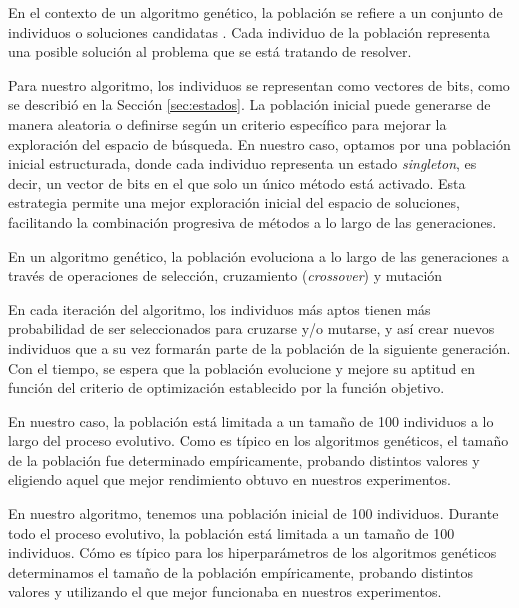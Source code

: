 En el contexto de un algoritmo genético, la población se refiere a un conjunto de individuos o soluciones candidatas \cite{Goldberg:1989}. 
Cada individuo de la población representa una posible solución al problema que se está tratando de resolver.

Para nuestro algoritmo, los individuos se representan como vectores de bits, como se describió en la Sección \ref{sec:estados}. 
La población inicial puede generarse de manera aleatoria o definirse según un criterio específico para mejorar la exploración del espacio de búsqueda. 
En nuestro caso, optamos por una población inicial estructurada, donde cada individuo representa un estado \emph{singleton}, es decir, 
un vector de bits en el que solo un único método está activado. Esta estrategia permite una mejor exploración inicial del espacio de soluciones, 
facilitando la combinación progresiva de métodos a lo largo de las generaciones.

En un algoritmo genético, la población evoluciona a lo largo de las generaciones a través de operaciones de selección, 
cruzamiento (\emph{crossover}) y mutación \cite{Goldberg:1989}

En cada iteración del algoritmo, los individuos más aptos tienen más probabilidad de ser seleccionados para cruzarse y/o mutarse, 
y así crear nuevos individuos que a su vez formarán parte de la población de la siguiente generación. Con el tiempo, se espera que la población evolucione y
mejore su aptitud en función del criterio de optimización establecido por la función objetivo.

En nuestro caso, la población está limitada a un tamaño de 100 individuos a lo largo del proceso evolutivo. Como es típico en los algoritmos genéticos, 
el tamaño de la población fue determinado empíricamente, probando distintos valores y eligiendo aquel que mejor rendimiento obtuvo en nuestros experimentos.

En nuestro algoritmo, tenemos una población inicial de 100 individuos. Durante todo el proceso evolutivo, la población está limitada a un tamaño de 100 individuos. Cómo es típico para los hiperparámetros de los algoritmos genéticos determinamos el tamaño de la población empíricamente, probando distintos valores y utilizando el que mejor funcionaba en nuestros experimentos. 

